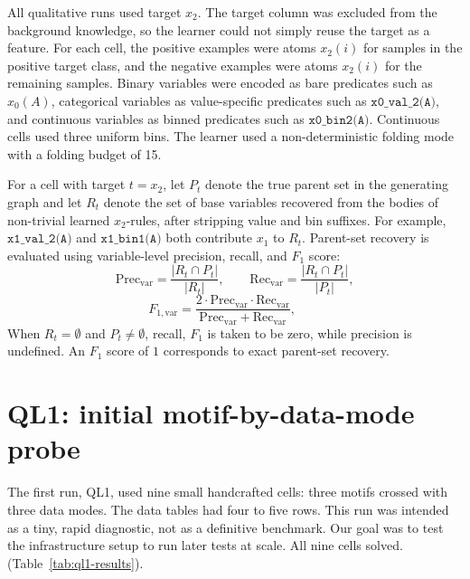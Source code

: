 All qualitative runs used target \(x_2\). The target column was excluded from the background knowledge, so the learner could not simply reuse the target as a feature. For each cell, the positive examples were atoms \(x_2(i)\) for samples in the positive target class, and the negative examples were atoms \(x_2(i)\) for the remaining samples. Binary variables were encoded as bare predicates such as \(x_0(A)\), categorical variables as value-specific predicates such as \(\texttt{x0\_val\_2(A)}\), and continuous variables as binned predicates such as \(\texttt{x0\_bin2(A)}\). Continuous cells used three uniform bins. The learner used a non-deterministic folding mode with a folding budget of 15.

For a cell with target \(t=x_2\), let \(P_t\) denote the true parent set in the generating graph and let \(R_t\) denote the set of base variables recovered from the bodies of non-trivial learned \(x_2\)-rules, after stripping value and bin suffixes. For example, \(\texttt{x1\_val\_2(A)}\) and \(\texttt{x1\_bin1(A)}\) both contribute \(x_1\) to \(R_t\). Parent-set recovery is evaluated using variable-level precision, recall, and \(F_1\) score:
\[
\mathrm{Prec}_{\mathrm{var}}=\frac{|R_t\cap P_t|}{|R_t|},
\qquad
\mathrm{Rec}_{\mathrm{var}}=\frac{|R_t\cap P_t|}{|P_t|},
\]
\[
F_{1,\mathrm{var}}
=
\frac{2\cdot \mathrm{Prec}_{\mathrm{var}}\cdot \mathrm{Rec}_{\mathrm{var}}}
{\mathrm{Prec}_{\mathrm{var}}+\mathrm{Rec}_{\mathrm{var}}},
\qquad
\]
When \(R_t=\emptyset\) and \(P_t\neq\emptyset\), recall, \(F_1\) is taken to be zero, while precision is undefined. An \(F_1\) score of \(1\) corresponds to exact parent-set recovery.

\section{QL1: initial motif-by-data-mode probe}
The first run, QL1, used nine small handcrafted cells: three motifs crossed with three data modes. The data tables had four to five rows. This run was intended as a tiny, rapid diagnostic, not as a definitive benchmark. Our goal was to test the infrastructure setup to run later tests at scale. All nine cells solved. (Table~\ref{tab:ql1-results}).

